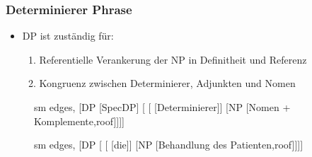 \begin{frame}
\frametitle{Determinierer Phrase}

	\begin{itemize}
		\item DP ist zuständig für:
		\begin{enumerate}
			\item Referentielle Verankerung der NP in Definitheit und Referenz
			\item Kongruenz zwischen Determinierer, Adjunkten und Nomen
		\end{enumerate}				
	\end{itemize}


\begin{figure}[b]
  	\begin{minipage}[b]{0.6\textwidth}
	\centering
	\footnotesize{
		\begin{forest}
		sm edges,
		[DP [SpecDP]
			[ 	[ [Determinierer]]
						[NP [Nomen + Komplemente,roof]]]]
		\end{forest}
		}
  	\end{minipage}  
 	\pause            
	\begin{minipage}[b]{0.35\textwidth}
	\centering
	\footnotesize{
		\begin{forest}
		sm edges,
		[DP [ 	[ [die]]
						[NP [Behandlung des Patienten,roof]]]]
		\end{forest}
		}
  	\end{minipage}  
\end{figure}

\end{frame}


